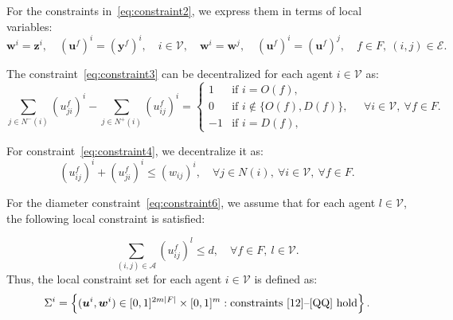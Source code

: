 \documentclass[11pt,a4paper]{article}
\theoremstyle{plain}
\theoremstyle{definition}
\theoremstyle{remark}
\begin{document}
	For the constraints in~\eqref{eq:constraint2}, we express them in terms of local variables:
	\begin{equation}
		\boldsymbol{w}^i = \boldsymbol{z}^i, 
		\quad (\boldsymbol{u}^f)^i = (\boldsymbol{y}^f)^i, 
		\quad i \in \mathcal{V}, \quad
		\boldsymbol{w}^i = \boldsymbol{w}^j, \quad 
		(\boldsymbol{u}^f)^i = (\boldsymbol{u}^f)^j, 
		\quad f \in F,\ (i,j) \in \mathcal{E}.
	\end{equation}
	
	The constraint~\eqref{eq:constraint3} can be decentralized for each agent \(i \in \mathcal{V}\) as:
	\begin{equation}
		\sum_{j \in N^{-}(i)} \left( u_{ji}^f \right)^i 
		- \sum_{j \in N^{+}(i)} \left( u_{ij}^f \right)^i =
		\begin{cases}
			1 & \text{if } i = O(f), \\
			0 & \text{if } i \notin \{O(f), D(f)\}, \\
			-1 & \text{if } i = D(f),
		\end{cases}
		\quad \forall i \in \mathcal{V},\ \forall f \in F.\label{12}
	\end{equation}
	
	For constraint~\eqref{eq:constraint4}, we decentralize it as:
	\begin{equation}
		\left( u_{ij}^f \right)^i + \left( u_{ji}^f \right)^i 
		\leq \left( w_{ij} \right)^i,
		\quad \forall j \in N(i),\ \forall i \in \mathcal{V},\ \forall f \in F.
	\end{equation}
	
	For the diameter constraint~\eqref{eq:constraint6},	we assume that for each agent \(l \in \mathcal{V}\), the following local constraint is satisfied:
	
	\begin{equation}\sum_{(i,j) \in \mathcal{A}} \left( u_{ij}^f\right)^l \leq d, \quad \forall f \in F,\ l\in \mathcal{V}.\label{QQ}
	\end{equation}
	Thus, the local constraint set for each agent \(i \in \mathcal{V}\) is defined as:
	\[
	\Sigma^i = \left\{
	(\boldsymbol{u}^i, \boldsymbol{w}^i) \in [0,1]^{2m|F|}\times[0,1]^m  :
	\text{constraints~\eqref{12}--\eqref{QQ} hold}
	\right\}.
	\]
	
\end{document}
